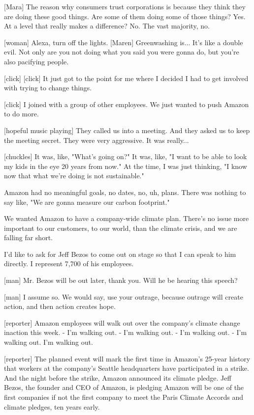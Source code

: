 \documentclass[a4paper]{article}
\begin{document}
	[Mara] The reason why consumers trust corporations is because they think they are doing these good things.
	Are some of them doing some of those things? Yes.
	At a level that really makes a difference? No.
	The vast majority, no.
	
	
	[woman] Alexa, turn off the lights.
	[Maren] Greenwashing is... It's like a double evil.
	Not only are you not doing what you said you were gonna do, but you're also pacifying people.
	
	
	
	[click]
	[click]
	It just got to the point for me where I decided I had to get involved with trying to change things.
	
	
	[click]
	I joined with a group of other employees.
	We just wanted to push Amazon to do more.
	
	
	[hopeful music playing]
	They called us into a meeting.
	And they asked us to keep the meeting secret.
	They were very aggressive. It was really...
	
	
	[chuckles] It was, like, "What's going on?"
	It was, like, "I want to be able to look my kids in the eye 20 years from now."
	At the time, I was just thinking, "I know now that what we're doing is not sustainable."
	
	
	Amazon had no meaningful goals, no dates, no, uh, plans.
	There was nothing to say like, "We are gonna measure our carbon footprint."
	
	
	We wanted Amazon to have a company-wide climate plan.
	There's no issue more important to our customers, to our world, than the climate crisis, and we are falling far short.
	
	
	I'd like to ask for Jeff Bezos to come out on stage so that I can speak to him directly.
	I represent 7,700 of his employees.
	
	
	[man] Mr. Bezos will be out later, thank you.
	Will he be hearing this speech?
	
	
	[man] I assume so.
	We would say, use your outrage, because outrage will create action, and then action creates hope.
	
	
	[reporter] Amazon employees will walk out over the company's climate change inaction this week.
	- I'm walking out. - I'm walking out.
	- I'm walking out. - I'm walking out.
	I'm walking out.
	
	
	[reporter] The planned event will mark the first time in Amazon's 25-year history that workers at the company's Seattle headquarters have participated in a strike.
	And the night before the strike, Amazon announced its climate pledge.
	Jeff Bezos, the founder and CEO of Amazon, is pledging Amazon will be one of the first companies if not the first company to meet the Paris Climate Accords and climate pledges, ten years early.
	
\end{document}
